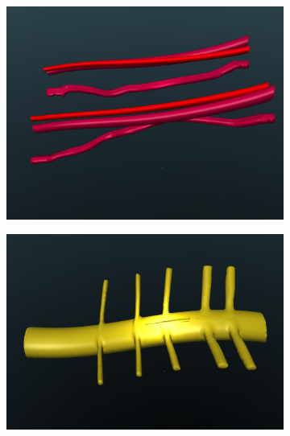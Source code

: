 \documentclass[a4paper, 12pt]{article}
\begin{document}
\begin{figure}[h!]{}
\begin{subfigure}[t]{0.45\textwidth}
           \label{fig:fig04b}
    \end{subfigure}
        \begin{subfigure}[t]{0.45\textwidth}
\includegraphics[width=\textwidth]{Figures/fig08c.pdf}
           \label{fig:fig08c}
    \end{subfigure}
    \begin{subfigure}[t]{0.5\textwidth}
    \includegraphics[width=\textwidth]{Figures/fig08d.pdf}
           \label{fig:fig04d}
    \end{subfigure}
        \begin{subfigure}[t]{0.45\textwidth}

\end{subfigure}
\end{figure}
\end{document}
